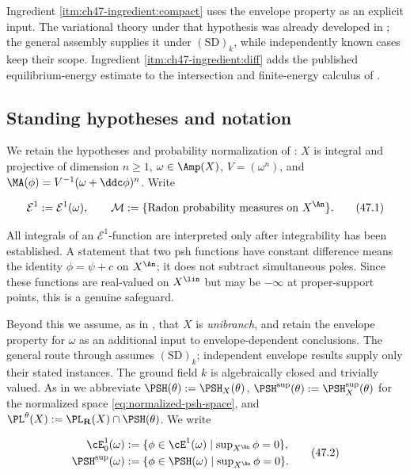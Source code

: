 Ingredient \cref{itm:ch47-ingredient:compact} uses the envelope property
as an explicit input. The variational theory under that hypothesis was
already developed in \cite{BJ22}; the general assembly supplies it
under $\mathrm{(SD)}_k$, while independently known cases keep their scope. Ingredient
\cref{itm:ch47-ingredient:diff} adds the published equilibrium-energy
estimate to the intersection and finite-energy calculus of
.

\subsection{Standing hypotheses and notation}
\label{sec:ch47-hypotheses}

We retain the hypotheses and probability normalization of
: $X$ is integral and projective of dimension
$n\ge1$, $\omega\in\Amp(X)$, $V=(\omega^n)$, and
$\MA(\phi)=V^{-1}(\omega+\ddc\phi)^n$.  Write

\[
 \mathcal E^1:=\mathcal E^1(\omega),\qquad
 \mathcal M:=\{\hbox{Radon probability measures on }X^{\An}\}.
\tag{47.1}\label{eq:bj-e1-m-probability}
\]

All integrals of an $\mathcal E^1$-function are interpreted only after
integrability has been established. A statement that two psh functions
have constant difference means the identity $\phi=\psi+c$ on $X^{\An}$;
it does not subtract simultaneous poles.  Since these functions are real-valued
on $X^{\lin}$ but may be $-\infty$ at proper-support points, this is a
genuine safeguard.

Beyond this we assume, as in , that $X$ is
\emph{unibranch}, and retain the envelope property for $\omega$ as an
additional input to envelope-dependent conclusions. The general route
through  assumes $\mathrm{(SD)}_k$;
independent envelope results supply only their stated instances.
The ground field $k$ is algebraically
closed and trivially valued.  As in  we abbreviate
$\PSH(\theta):=\PSH_X(\theta)$, $\PSH^{\sup}(\theta):=\PSH^{\sup}_X(\theta)$
for the normalized space \eqref{eq:normalized-psh-space}, and
$\PL^\theta(X):=\PL_{\mathbf R}(X)\cap\PSH(\theta)$.  We write

\[
 \begin{aligned}
 \cE^1_0(\omega)
 &:=\{\phi\in\cE^1(\omega)
      \mid\textstyle\sup_{X^{\An}}\phi=0\},\\
 \PSH^{\sup}(\omega)
 &:=\{\phi\in\PSH(\omega)
      \mid\textstyle\sup_{X^{\An}}\phi=0\}.
 \end{aligned}
\tag{47.2}\label{eq:ch47-normalized-classes}
\]

